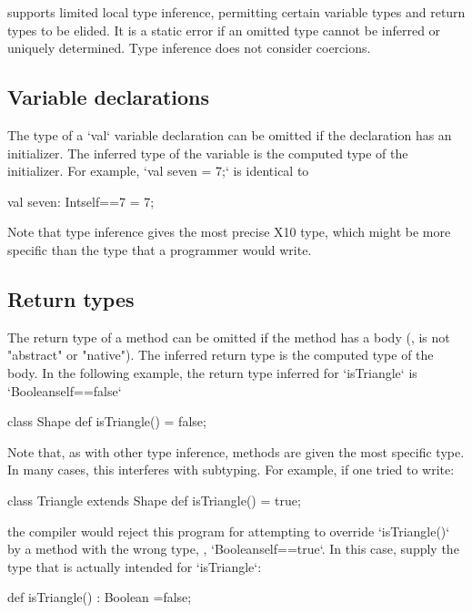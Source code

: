 \XtenCurrVer{} supports limited local type inference, permitting
certain variable types and return types to be elided.
It is a static error if an omitted type cannot be inferred or
uniquely determined. Type inference does not consider coercions.

\subsection{Variable declarations}

The type of a \xcd`val` variable declaration can be omitted if the
declaration has an initializer.  The inferred type of the
variable is the computed type of the initializer.
For example, 
\xcd`val seven = 7;`
is identical to 
\begin{xtenmath}
val seven: Int{self==7} = 7;
\end{xtenmath}
Note that type inference gives the most precise X10 type, which might be more
specific than the type that a programmer would write.




\subsection{Return types}

The return type of a method can be omitted if the method has a body (\ie, is
not \xcd"abstract" or \xcd"native"). The inferred return type is the computed
type of the body.  In the following example, the return type inferred for
\xcd`isTriangle` is 
\xcd`Boolean{self==false}`
\begin{xten}
class Shape {
  def isTriangle() = false; 
}  
\end{xten}
%
Note that, as with other type inference, methods are given the most specific
type.  In many cases, this interferes with subtyping.  For example, if one
tried to write: 
\begin{xten}
class Triangle extends Shape {
  def isTriangle() = true;
}
\end{xten}
\noindent
the compiler would reject this program for attempting to override
\xcd`isTriangle()` by a method with the wrong type, \viz,
\xcd`Boolean{self==true}`.  In this case, supply the type that is actually
intended for \xcd`isTriangle`: 
\begin{xtenmath}
def isTriangle() : Boolean =false;
\end{xtenmath}

